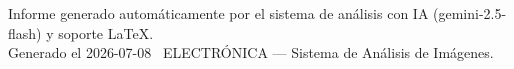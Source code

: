 \documentclass[11pt,a4paper]{article}
\begin{document}


\vspace{12pt}
\begin{center}
  \footnotesize\color{gray}
  Informe generado automáticamente por el sistema de análisis con IA (gemini-2.5-flash) y soporte LaTeX. \\
  Generado el 2026-07-08 \textbullet\ ELECTRÓNICA --- Sistema de Análisis de Imágenes.
\end{center}
\end{document}
